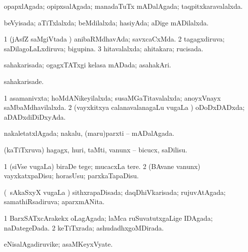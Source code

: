 \bentry
{} 
\gl{\gu}
\expl{}
\bmng
 opapxlAgada; opipxsalAgada; manadaTuTx mADalAgada; taqpitxkaravalalxda. 
\emng
\eentry

\bentry
{} 
\gl{\gu}
\expl{}
\bmng
 beVyisada; aTiTxlalxda; beMdilalxda; hasiyAda; aDige mADilalxda. 
\emng
\eentry

\bentry
{} 
\gl{\gu}
\bmng
\bnum
\num{1} (jAsfZ saMgiVtada \vi) anibaRMdhavAda; savxcaCxMda. 
\num{2} tagagxdiruva; saDilagoLaLxdiruva; bigupina. 
\num{3} hitavalalxda; ahitakara; rucisada. 
\enum
\emng
\eentry

\bentry
{} 
\gl{\gu}
\expl{}
\bmng
 sahakarisada; ogagxTATxgi kelasa mADada; asahakAri. 
\emng
\eentry

\bentry
{} 
\gl{\kirxvi}
\expl{}
\bmng
 sahakarisade. 
\emng
\eentry

\bentry
{} 
\gl{\gu}
\expl{}
\bmng
\bnum
\num{1} asamanivxta; hoMdANikeyilalxda; susaMGaTitavalalxda; anoyxVnayx saMbaMdhavilalxda. 
\num{2} (vayxkitxya calanavalanagaLu \mo vugaLa \vi) oDoDxDADxda; aDADxdiDiDxyAda. 
\enum
\emng
\eentry

\bentry
{} 
\gl{\gu}
\expl{}
\bmng
nakaletatxlAgada; nakalu, (maru)parxti -- mADalAgada. 
\emng
\eentry

\bentry
{} 
\gl{\sakirx}
\expl{}
\bmng
 (kaTiTxruva) hagagx, huri, taMti, \mo vanunx -- bicucx, saDilisu. 
\emng
\eentry

\bentry
{} 
\gl{\sakirx}
\expl{}
\bmng
\bnum
\num{1} (siVse \mo vugaLa) biraDe tege; mucacxLa tere. 
\num{2} (BAvane \mo vanunx) vayxkatxpaDisu; horasUsu; parxkaTapaDisu. 
\enum
\emng
\eentry

\bentry
{} 
\gl{\gu}
\expl{}
\bmng
 (\kanmu\ sAkaSxyX \mo vugaLa \vi) sithxrapaDisada; daqDhiVkarisada; rujuvAtAgada; samathiRsadiruva; aparxmANita. 
\emng
\eentry

\bentry
{} 
\gl{\gu}
\expl{}
\bmng
\bnum
\num{1} BarxSATxcArakekx oLagAgada; laMca ruSuvatutxgaLige IDAgada; naDategeDada. 
\num{2} keTiTxrada; ashudadhxgoMDirada. 
\enum
\emng
\eentry

\bentry
{} 
\gl{\nA}
\expl{}
\bmng
 eNisalAgadiruvike; asaMKeyxVyate. 
\emng
\eentry

